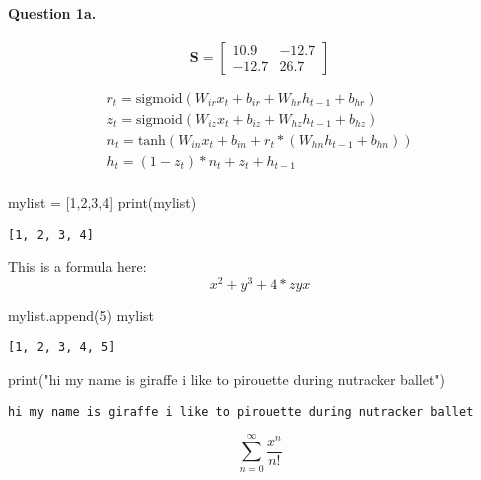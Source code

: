\documentclass[
]{article}
\author{}
\date{}
\newenvironment{Shaded}{}{}
\newcommand{\BuiltInTok}[1]{#1}
\newcommand{\DecValTok}[1]{\textcolor[rgb]{0.25,0.63,0.44}{#1}}
\newcommand{\NormalTok}[1]{#1}
\newcommand{\OperatorTok}[1]{\textcolor[rgb]{0.40,0.40,0.40}{#1}}
\newcommand{\StringTok}[1]{\textcolor[rgb]{0.25,0.44,0.63}{#1}}
\begin{document}
\hypertarget{question-1a.}{%
\paragraph{Question 1a.}\label{question-1a.}}

\[
\mathbf{S} = \left[\begin{array}
{rr}
10.9 & -12.7 \\
-12.7 & 26.7
\end{array}\right]
\]

\[
\begin{array}{ll}
r_t = \text{sigmoid}(W_{ir} x_t + b_{ir} + W_{hr} h_{t-1} + b_{hr}) \\
z_t = \text{sigmoid}(W_{iz} x_t + b_{iz} + W_{hz} h_{t-1} + b_{hz}) \\
n_t = \text{tanh}(W_{in} x_t + b_{in} + r_t * (W_{hn} h_{t-1} + b_{hn})) \\
h_t = (1 - z_t) * n_t + z_t + h_{t-1} \\
\end{array}
\]

\begin{Shaded}
\begin{Highlighting}[]
\NormalTok{mylist }\OperatorTok{=}\NormalTok{ [}\DecValTok{1}\NormalTok{,}\DecValTok{2}\NormalTok{,}\DecValTok{3}\NormalTok{,}\DecValTok{4}\NormalTok{]}
\BuiltInTok{print}\NormalTok{(mylist)}
\end{Highlighting}
\end{Shaded}

\begin{verbatim}
[1, 2, 3, 4]
\end{verbatim}

This is a formula here: \[
x^2 + y^3 + 4*zyx
\]

\begin{Shaded}
\begin{Highlighting}[]
\NormalTok{mylist.append(}\DecValTok{5}\NormalTok{)}
\NormalTok{mylist}
\end{Highlighting}
\end{Shaded}

\begin{verbatim}
[1, 2, 3, 4, 5]
\end{verbatim}

\begin{Shaded}
\begin{Highlighting}[]
\BuiltInTok{print}\NormalTok{(}\StringTok{"hi my name is giraffe i like to pirouette during nutracker ballet"}\NormalTok{)}
\end{Highlighting}
\end{Shaded}

\begin{verbatim}
hi my name is giraffe i like to pirouette during nutracker ballet
\end{verbatim}

\[
\sum_{n = 0}^{\infty} \frac {x^n} {n!}
\]
\end{document}
